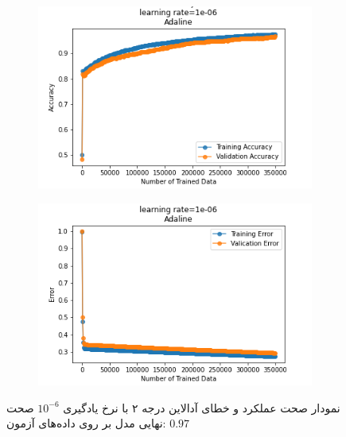 \documentclass[12pt, a4paper]{article}
\begin{document}
\begin{figure}[h]
    \begin{subfigure}{0.45\linewidth}
        \centering
        \includegraphics[width=\linewidth]{images/6/adaline/lr/acc_1e-06.png}
    \end{subfigure}
    \hfil
    \begin{subfigure}{0.45\linewidth}
        \centering
        \includegraphics[width=\linewidth]{images/6/adaline/lr/error_1e-06.png}
    \end{subfigure}
    \caption{نمودار صحت عملکرد‌ و خطای آدالاین درجه ۲ با نرخ یادگیری $10^{-6}$
    \newline
    صحت نهایی مدل بر روی داده‌های آزمون: $0.97$}
\end{figure}

\clearpage
\end{document}
